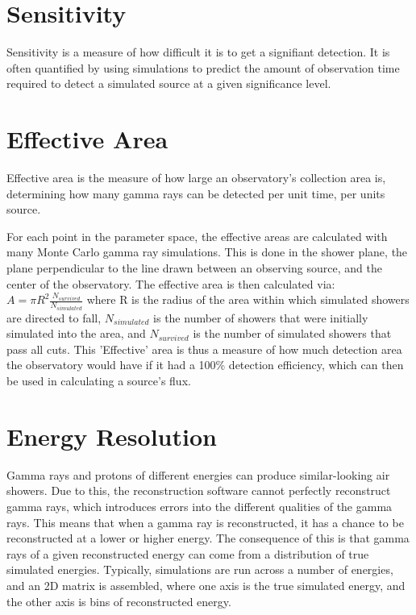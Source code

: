 \section{Sensitivity}
Sensitivity is a measure of how difficult it is to get a signifiant detection.
It is often quantified by using simulations to predict the amount of observation time required to detect a simulated source at a given significance level.


\section{Effective Area}
Effective area is the measure of how large an observatory's collection area is, determining how many gamma rays can be detected per unit time, per units source.

For each point in the parameter space, the effective areas are calculated with many Monte Carlo gamma ray simulations.
This is done in the shower plane, the plane perpendicular to the line drawn between an observing source, and the center of the observatory.
The effective area is then calculated via:
$A=\pi R^2 \frac{N_{survived}}{N_{simulated}}$
where R is the radius of the area within which simulated showers are directed to fall, $N_{simulated}$ is the number of showers that were initially simulated into the area, and $N_{survived}$ is the number of simulated showers that pass all cuts.
This 'Effective' area is thus a measure of how much detection area the observatory would have if it had a 100\% detection efficiency, which can then be used in calculating a source's flux.



\section{Energy Resolution}
Gamma rays and protons of different energies can produce similar-looking air showers.
Due to this, the reconstruction software cannot perfectly reconstruct gamma rays, which introduces errors into the different qualities of the gamma rays.
This means that when a gamma ray is reconstructed, it has a chance to be reconstructed at a lower or higher energy.
The consequence of this is that gamma rays of a given reconstructed energy can come from a distribution of true simulated energies.
Typically, simulations are run across a number of energies, and an 2D matrix is assembled, where one axis is the true simulated energy, and the other axis is bins of reconstructed energy.


